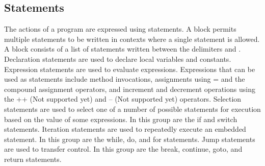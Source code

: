 \documentclass[a4paper]{article}
\begin{document}
\subsection{Statements}
The actions of a program are expressed using statements. 
A block permits multiple statements to be written in contexts where a single statement is allowed. A block consists of a list of statements written between the delimiters { and }.
Declaration statements are used to declare local variables and constants.
Expression statements are used to evaluate expressions. Expressions that can be used as statements include method invocations, assignments using = and the compound assignment operators, and increment and decrement operations using the ++ (Not supported yet) and -- (Not supported yet) operators.
Selection statements are used to select one of a number of possible statements for execution based on the value of some expressions. In this group are the if and switch statements.
Iteration statements are used to repeatedly execute an embedded statement. In this group are the while, do, and for statements.
Jump statements are used to transfer control. In this group are the break, continue, goto, and return statements.
\end{document}
